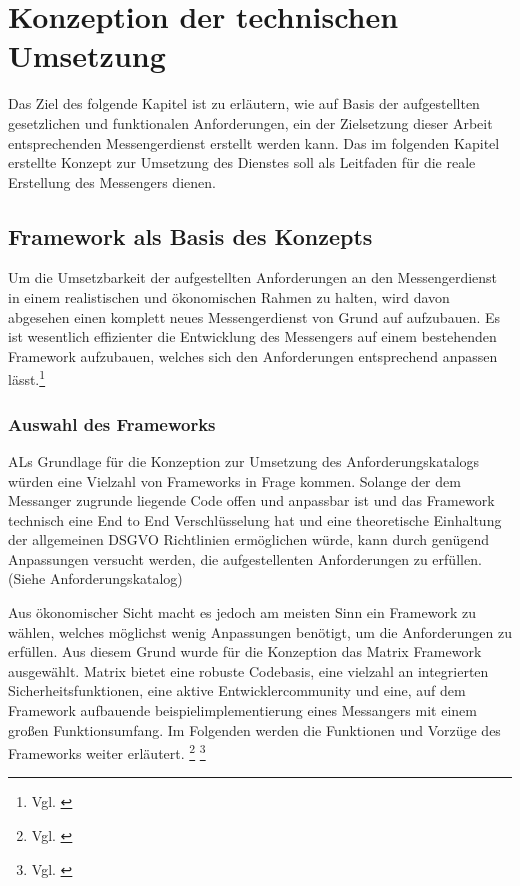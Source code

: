 \chapter{Konzeption der technischen Umsetzung}\label{chapter:tanforderungen}
Das Ziel des folgende Kapitel ist zu erläutern, wie auf Basis der aufgestellten gesetzlichen und funktionalen Anforderungen, ein der Zielsetzung dieser Arbeit entsprechenden Messengerdienst erstellt werden kann. Das im folgenden Kapitel erstellte Konzept zur Umsetzung des Dienstes soll als Leitfaden für die reale Erstellung des Messengers dienen. 

\section{Framework als Basis des Konzepts}\label{chapter:kr}
Um die Umsetzbarkeit der aufgestellten Anforderungen an den Messengerdienst in einem realistischen und ökonomischen Rahmen zu halten, wird davon abgesehen einen komplett neues Messengerdienst von Grund auf aufzubauen. Es ist wesentlich effizienter die Entwicklung des Messengers auf einem bestehenden Framework aufzubauen, welches sich den Anforderungen entsprechend anpassen lässt.\footnote{Vgl. \cite[S. 107 ff.]{Johnson2005}}

\subsection{Auswahl des Frameworks}\label{chapter:am}
ALs Grundlage für die Konzeption zur Umsetzung des Anforderungskatalogs würden eine Vielzahl von Frameworks in Frage kommen. Solange der dem Messanger zugrunde liegende Code offen und anpassbar ist und das Framework technisch eine End to End Verschlüsselung hat und eine theoretische Einhaltung der allgemeinen DSGVO Richtlinien ermöglichen würde, kann durch genügend Anpassungen versucht werden, die aufgestellenten Anforderungen zu erfüllen. (Siehe Anforderungskatalog)

Aus ökonomischer Sicht macht es jedoch am meisten Sinn ein Framework zu wählen, welches möglichst wenig Anpassungen benötigt, um die Anforderungen zu erfüllen. Aus diesem Grund wurde für die Konzeption das Matrix Framework ausgewählt.
Matrix bietet eine robuste Codebasis, eine vielzahl an integrierten Sicherheitsfunktionen, eine aktive Entwicklercommunity und eine, auf dem Framework aufbauende beispielimplementierung eines Messangers mit einem großen Funktionsumfang. Im Folgenden werden die Funktionen und Vorzüge des Frameworks weiter erläutert. \footnote{Vgl. \cite{Matrix.org2020}} \footnote{Vgl. \cite{Github2020}} 

